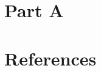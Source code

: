 {\section{Part A}









\section{References}
\begingroup
\renewcommand{\section}[2]{}%


\endgroup















 








